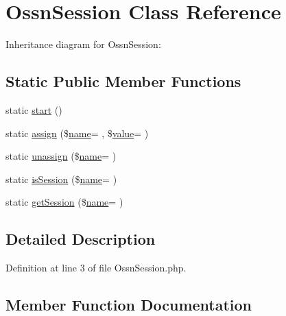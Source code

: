 \hypertarget{class_ossn_session}{}\section{Ossn\+Session Class Reference}
\label{class_ossn_session}


Inheritance diagram for Ossn\+Session\+:
\subsection*{Static Public Member Functions}
\begin{DoxyCompactItemize}
\item 
static \hyperlink{class_ossn_session_a146085d0f3a9d17bdcd7f3d4081d8c0d}{start} ()
\item 
static \hyperlink{class_ossn_session_a9603f0e31e6b608857368966c03e2178}{assign} (\$\hyperlink{user_8php_a765af5e9671743530143a6d3670fd9a6}{name}= \textquotesingle{}\textquotesingle{}, \$\hyperlink{fullpage_2plugin_8min_8js_ac56c57897e10f699d124e0103921aa20}{value}= \textquotesingle{}\textquotesingle{})
\item 
static \hyperlink{class_ossn_session_a6d075cdda849a864e4536ff5884e463b}{unassign} (\$\hyperlink{user_8php_a765af5e9671743530143a6d3670fd9a6}{name}= \textquotesingle{}\textquotesingle{})
\item 
static \hyperlink{class_ossn_session_a4c2840415419fa88f7533c095da74270}{is\+Session} (\$\hyperlink{user_8php_a765af5e9671743530143a6d3670fd9a6}{name}= \textquotesingle{}\textquotesingle{})
\item 
static \hyperlink{class_ossn_session_afc48059ee2745547034bd3b97fcd49f6}{get\+Session} (\$\hyperlink{user_8php_a765af5e9671743530143a6d3670fd9a6}{name}= \textquotesingle{}\textquotesingle{})
\end{DoxyCompactItemize}


\subsection{Detailed Description}


Definition at line 3 of file Ossn\+Session.\+php.



\subsection{Member Function Documentation}
